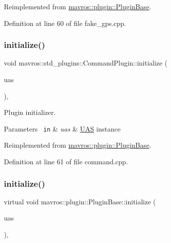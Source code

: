 Reimplemented from \mbox{\hyperlink{group__plugin_gad5313a41da4d26acbbabf008cdc21e82}{mavros\+::plugin\+::\+Plugin\+Base}}.



Definition at line 60 of file fake\+\_\+gps.\+cpp.

\mbox{\label{group__plugin_ga4093176dbbf2e0118a02d423d19f9faf}} 
\subsubsection{\texorpdfstring{initialize()}{initialize()}\hspace{0.1cm}{\footnotesize\ttfamily [34/41]}}
{\footnotesize\ttfamily void mavros\+::std\+\_\+plugins\+::\+Command\+Plugin\+::initialize (\begin{DoxyParamCaption}\item[{\mbox{\hyperlink{classmavros_1_1UAS}{U\+AS}} \&}]{uas }\end{DoxyParamCaption})\hspace{0.3cm}{\ttfamily [inline]}, {\ttfamily [virtual]}}



Plugin initializer. 


\begin{DoxyParams}[1]{Parameters}
\mbox{\texttt{ in}}  & {\em uas} & {\ttfamily \mbox{\hyperlink{classmavros_1_1UAS}{U\+AS}}} instance \\
\hline
\end{DoxyParams}


Reimplemented from \mbox{\hyperlink{group__plugin_gad5313a41da4d26acbbabf008cdc21e82}{mavros\+::plugin\+::\+Plugin\+Base}}.



Definition at line 61 of file command.\+cpp.

\mbox{\label{group__plugin_gad5313a41da4d26acbbabf008cdc21e82}} 
\subsubsection{\texorpdfstring{initialize()}{initialize()}\hspace{0.1cm}{\footnotesize\ttfamily [35/41]}}
{\footnotesize\ttfamily virtual void mavros\+::plugin\+::\+Plugin\+Base\+::initialize (\begin{DoxyParamCaption}\item[{\mbox{\hyperlink{classmavros_1_1UAS}{U\+AS}} \&}]{uas }\end{DoxyParamCaption})\hspace{0.3cm}{\ttfamily [inline]}, {\ttfamily [virtual]}}



